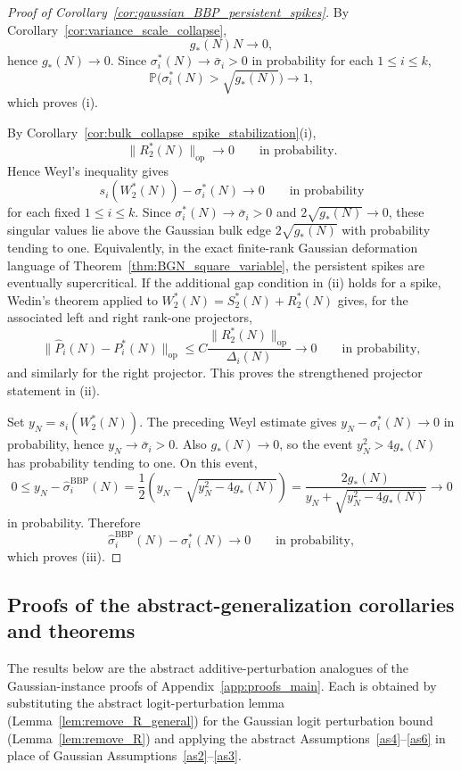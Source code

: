 \documentclass[11pt]{article}
\theoremstyle{plain}
\theoremstyle{definition}
\theoremstyle{remark}
\newcommand{\PP}{\mathbb{P}}
\newcommand{\op}{\mathrm{op}}
\newcommand{\1}{\mathbf{1}}
\begin{document}
\begin{proof}[Proof of Corollary~\ref{cor:gaussian_BBP_persistent_spikes}]
By Corollary~\ref{cor:variance_scale_collapse},
\[
g_*(N)N\to0,
\]
hence \(g_*(N)\to0\). Since \(\sigma_i^*(N)\to\bar\sigma_i>0\) in probability for each \(1\le i\le k\),
\[
\PP\!\big(\sigma_i^*(N)>\sqrt{g_*(N)}\big)\to1,
\]
which proves (i).

By Corollary~\ref{cor:bulk_collapse_spike_stabilization}(i),
\[
\|R_2^*(N)\|_{\op}\to0
\qquad\text{in probability}.
\]
Hence Weyl's inequality gives
\[
s_i(W_2^*(N))-\sigma_i^*(N)\to0
\qquad\text{in probability}
\]
for each fixed \(1\le i\le k\). Since \(\sigma_i^*(N)\to\bar\sigma_i>0\) and \(2\sqrt{g_*(N)}\to0\), these singular values lie above the Gaussian bulk edge \(2\sqrt{g_*(N)}\) with probability tending to one. Equivalently, in the exact finite-rank Gaussian deformation language of Theorem~\ref{thm:BGN_square_variable}, the persistent spikes are eventually supercritical. If the additional gap condition in (ii) holds for a spike, Wedin's theorem applied to \(W_2^*(N)=S_2^*(N)+R_2^*(N)\) gives, for the associated left and right rank-one projectors,
\[
\|\widehat P_i(N)-P_i^*(N)\|_{\op}
\le
C\frac{\|R_2^*(N)\|_{\op}}{\Delta_i(N)}
\to0
\qquad\text{in probability},
\]
and similarly for the right projector. This proves the strengthened projector statement in (ii).

Set \(y_N=s_i(W_2^*(N))\). The preceding Weyl estimate gives \(y_N-\sigma_i^*(N)\to0\) in probability, hence \(y_N\to\bar\sigma_i>0\). Also \(g_*(N)\to0\), so the event \(y_N^2>4g_*(N)\) has probability tending to one. On this event,
\[
0\le
y_N-\widehat\sigma_i^{\mathrm{BBP}}(N)
=
\frac12\left(y_N-\sqrt{y_N^2-4g_*(N)}\right)
=
\frac{2g_*(N)}{y_N+\sqrt{y_N^2-4g_*(N)}}
\to0
\]
in probability. Therefore
\[
\widehat\sigma_i^{\mathrm{BBP}}(N)-\sigma_i^*(N)\to0
\qquad\text{in probability},
\]
which proves (iii).
\end{proof}

\subsection{Proofs of the abstract-generalization corollaries and theorems}
\label{app:proofs_abstract_generalizations}

The results below are the abstract additive-perturbation analogues of the Gaussian-instance proofs of Appendix~\ref{app:proofs_main}.  Each is obtained by substituting the abstract logit-perturbation lemma (Lemma~\ref{lem:remove_R_general}) for the Gaussian logit perturbation bound (Lemma~\ref{lem:remove_R}) and applying the abstract Assumptions~\ref{as4}--\ref{as6} in place of Gaussian Assumptions~\ref{as2}--\ref{as3}.
\end{document}
